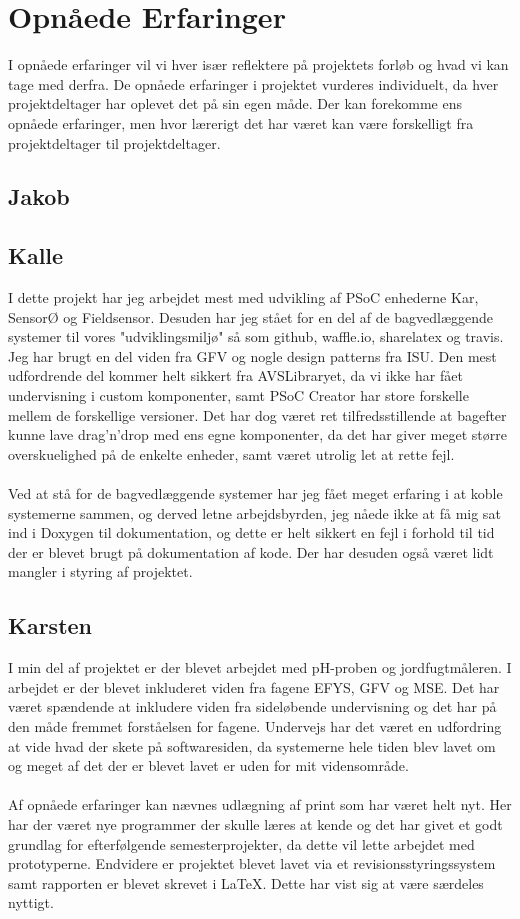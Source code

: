\section{Opnåede Erfaringer}
I opnåede erfaringer vil vi hver især reflektere på projektets forløb og hvad vi kan tage med derfra. De opnåede erfaringer i projektet vurderes individuelt, da hver projektdeltager har oplevet det på sin egen måde. Der kan forekomme ens opnåede erfaringer, men hvor lærerigt det har været kan være forskelligt fra projektdeltager til projektdeltager.

\subsection{Jakob}

\subsection{Kalle}
I dette projekt har jeg arbejdet mest med udvikling af PSoC enhederne Kar, SensorØ og Fieldsensor. Desuden har jeg  stået for en del af de bagvedlæggende systemer til vores "udviklingsmiljø" så som github, waffle.io, sharelatex og travis. Jeg har brugt en del viden fra GFV og nogle design patterns fra ISU. Den mest udfordrende del kommer helt sikkert fra AVSLibraryet, da vi ikke har fået undervisning i custom komponenter, samt PSoC Creator har store forskelle mellem de forskellige versioner. Det har dog været ret tilfredsstillende at bagefter kunne lave drag'n'drop med ens egne komponenter, da det har giver meget større overskuelighed på de enkelte enheder, samt været utrolig let at rette fejl.\\\\
Ved at stå for de bagvedlæggende systemer har jeg fået meget erfaring i at koble systemerne sammen, og derved letne arbejdsbyrden, jeg nåede ikke at få mig sat ind i Doxygen til dokumentation, og dette er helt sikkert en fejl i forhold til tid der er blevet brugt på dokumentation af kode. Der har desuden også været lidt mangler i styring af projektet. 

\subsection{Karsten}
I min del af projektet er der blevet arbejdet med pH-proben og jordfugtmåleren. I arbejdet er der blevet inkluderet viden fra fagene EFYS, GFV og MSE. Det har været spændende at inkludere viden fra sideløbende undervisning og det har på den måde fremmet forståelsen for fagene. Undervejs har det været en udfordring at vide hvad der skete på softwaresiden, da systemerne hele tiden blev lavet om og meget af det der er blevet lavet er uden for mit vidensområde.
\\\\
Af opnåede erfaringer kan nævnes udlægning af print som har været helt nyt. Her har der været nye programmer der skulle læres at kende og det har givet et godt grundlag for efterfølgende semesterprojekter, da dette vil lette arbejdet med prototyperne. Endvidere er projektet blevet lavet via et revisionsstyringssystem samt rapporten er blevet skrevet i LaTeX. Dette har vist sig at være særdeles nyttigt. 

